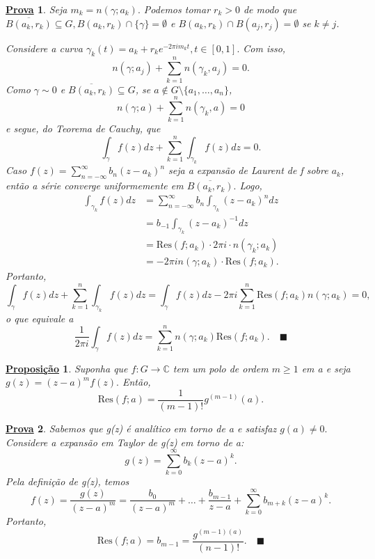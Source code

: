 \documentclass{article}
\newtheorem*{proof*}{\underline{Prova}}
\newtheorem*{prop*}{\underline{Proposi\c c\~ao}}
\renewcommand\qedsymbol{$\blacksquare$}
\begin{document}
  \begin{proof*}
    Seja \(m_{k} = n(\gamma ; a_{k}).\) Podemos tomar \(r_{k}>0\) de modo que \(\overline{B(a_{k}, r_{k})}\subseteq G, B(a_{k}, r_{k})\cap\{\gamma \}=\emptyset \) e 
    \(B(a_{k}, r_{k})\cap B(a_{j}, r_{j}) = \emptyset \) se \(k\neq j\).

    Considere a curva \(\gamma_{k}(t) = a_{k} + r_{k}e^{-2\pi i m_{k}t},t\in[0, 1].\) Com isso,
    \[
      n(\gamma ; a_{j}) + \sum\limits_{k=1}^{n}n(\gamma_{k}, a_{j}) = 0.
    \]
    Como \(\gamma \sim 0\) e \(\overline{B(a_{k}, r_{k})}\subseteq G\), se \(a\not\in G\setminus{\{a_{1},\dotsc ,a_{n}\}}\),
    \[
      n(\gamma ; a) + \sum\limits_{k=1}^{n}n(\gamma_{k}, a) = 0
    \]
    e segue, do Teorema de Cauchy, que 
    \[
      \int_{\gamma }^{}f(z)dz + \sum\limits_{k=1}^{n}\int_{\gamma_{k}}^{}f(z)dz = 0.
    \]
    Caso \(f(z) = \sum\limits_{n=-\infty}^{\infty}b_{n}(z-a_{k})^{n}\) seja a expansão de Laurent de f sobre \(a_{k}\), então a série converge uniformemente
    em \(\overline{B(a_{k}, r_{k})}.\) Logo,
    \begin{align*}
      \int_{\gamma_{k}}^{}f(z)dz &= \sum\limits_{n=-\infty}^{\infty}b_{n}\int_{\gamma_{k}}^{}(z-a_{k})^{n}dz\\
                                 &= b_{-1}\int_{\gamma_{k}}^{}(z-a_{k})^{-1}dz\\
                                 &= \mathrm{Res}(f; a_{k})\cdot 2\pi i \cdot n(\gamma_{k}; a_{k})\\
                                 &= -2\pi i n(\gamma ; a_{k})\cdot \mathrm{Res}(f; a_{k}).
    \end{align*}
    Portanto, 
    \[
      \int_{\gamma }^{}f(z)dz + \sum\limits_{k=1}^{n}\int_{\gamma_{k}}^{}f(z)dz = \int_{\gamma }^{}f(z)dz - 2\pi i \sum\limits_{k=1}^{n}\mathrm{Res}(f; a_{k})n(\gamma ; a_{k}) = 0,
    \]
    o que equivale a 
    \[
      \frac{1}{2\pi i}\int_{\gamma }^{}f(z)dz = \sum\limits_{k=1}^{n}n(\gamma ; a_{k})\mathrm{Res}(f; a_{k}).\quad \text{\qedsymbol}
    \]
  \end{proof*}
  \begin{prop*}
    Suponha que \(f:G\rightarrow \mathbb{C}\) tem um polo de ordem \(m \geq 1\) em a e seja \(g(z) = (z-a)^{m}f(z).\) Então,
    \[
      \mathrm{Res}(f; a) = \frac{1}{(m-1)!}g^{(m-1)}(a).
    \]
  \end{prop*}
  \begin{proof*}
    Sabemos que g(z) é analítico em torno de a e satisfaz \(g(a)\neq 0.\) Considere a expansão em Taylor de g(z) em torno de a:
    \[
      g(z) = \sum\limits_{k=0}^{\infty}b_{k}(z-a)^{k}.
    \]
    Pela definição de g(z), temos 
    \[
      f(z) = \frac{g(z)}{(z-a)^{m}} = \frac{b_{0}}{(z-a)^{m}} + \dotsc + \frac{b_{m-1}}{z-a} + \sum\limits_{k=0}^{\infty}b_{m+k}(z-a)^{k}. 
    \]
    Portanto,
    \[
      \mathrm{Res}(f; a) = b_{m-1} = \frac{g^{(m-1)(a)}}{(n-1)!}.\quad \text{\qedsymbol}
    \]
  \end{proof*}
\end{document}
